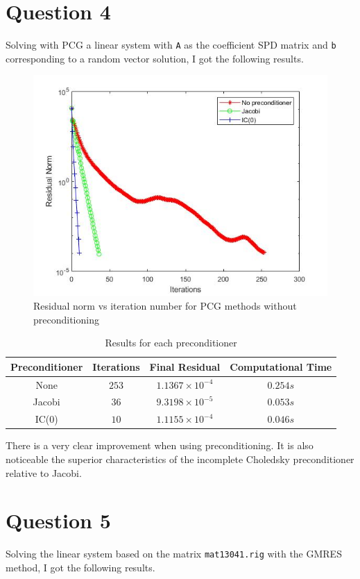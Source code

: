 \documentclass[a4paper, 11pt]{article}
\begin{document}
		
		\section*{Question 4}	
			Solving with PCG a linear system with \texttt{A} as the coefficient SPD matrix and \texttt{b} corresponding to a random vector solution, I got the following results.
				
			\begin{figure}[H]
				\centering
				\includegraphics[width=.6\linewidth]{ex4.jpg}
				\caption{Residual norm vs iteration number for PCG methods without preconditioning}
				\label{fig:ex4}
			\end{figure}
		
			\begin{table}[H]
			\centering
			\begin{tabular}{c|c|c|c}
				\textbf{Preconditioner} &  \textbf{Iterations} 	& \textbf{Final Residual} 		& \textbf{Computational Time} 	\\ \hline
				None					& 			$253$ 		& $ 1.1367 \times 10^{-4} $ 	& $ 0.254 s $	\\ \hline
				Jacobi					& 			$36$ 		& $ 9.3198 \times 10^{-5} $ 	& $ 0.053 s $	\\ \hline		
				IC(0)					& 			$10$		& $ 1.1155 \times 10^{-4} $		& $	0.046 s $	\\
			\end{tabular}
			\caption{Results for each preconditioner}
			\label{table:ex4}
			\end{table}
		
			There is a very clear improvement when using preconditioning.
			It is also noticeable the superior characteristics of the incomplete Choledsky preconditioner relative to Jacobi.
		
		\section*{Question 5}
			Solving the linear system based on the matrix \texttt{mat13041.rig} with the GMRES method, I got the following results.
			
\end{document}
